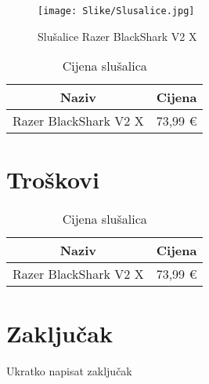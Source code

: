 \documentclass{article}
\begin{document}
    \begin{figure}[H]
        \centering
        \texttt{[image: Slike/Slusalice.jpg]}
        \caption{Slušalice Razer BlackShark V2 X}
        \label{fig:Slusalice}
    \end{figure}

    \begin{table}[H]
        \centering
        \begin{tabular}{|c|c|}
            \hline
            Naziv & Cijena \\
            \hline
            Razer BlackShark V2 X & 73,99 € \\
            \hline
        \end{tabular}
        \caption{Cijena slušalica}
        \label{tab:Slusalice}
    \end{table}

\clearpage
\section{Troškovi}

    \begin{table}[H]
        \centering
        \begin{tabular}{|c|c|}
            \hline
            Naziv & Cijena \\
            \hline
            Razer BlackShark V2 X & 73,99 € \\
            \hline
        \end{tabular}
        \caption{Cijena slušalica}
        \label{tab:Slusalice}
    \end{table}

\clearpage
\section{Zaključak}
Ukratko napisat zaključak
\clearpage

\listoffigures
\end{document}
